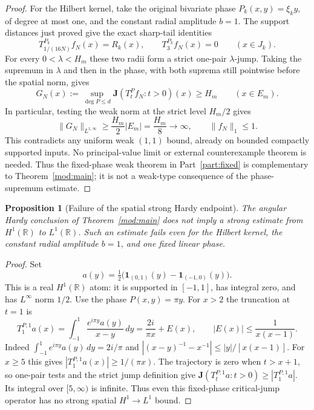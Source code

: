 \documentclass[11pt]{article}
\numberwithin{equation}{section}
\newtheorem{proposition}[theorem]{Proposition}
\theoremstyle{remark}
\theoremstyle{definition}
\begin{document}
\begin{proof}
For the Hilbert kernel, take the original bivariate phase
$P_k(x,y)=\xi_ky$, of degree at most one, and the constant radial amplitude
$b=1$. The support distances just proved give the exact sharp-tail identities
\[
 T^{P_k}_{1/(16N)}f_N(x)=R_k(x),\qquad
 T^{P_k}_{3}f_N(x)=0\qquad(x\in J_k).
\]
For every $0<\lambda<H_m$ these two radii form a strict one-pair
$\lambda$-jump. Taking the supremum in $\lambda$ and then in the phase,
with both suprema still pointwise before the spatial norm, gives
\[
 G_N(x):=\sup_{\deg P\le d}\mathbf J(T^P_t f_N:t>0)(x)
 \ge H_m\qquad(x\in E_m).
\]
In particular, testing the weak norm at the strict level $H_m/2$ gives
\[
 \|G_N\|_{L^{1,\infty}}
 \ge\frac{H_m}{2}|E_m|=\frac{H_m}{8}\longrightarrow\infty,
 \qquad \|f_N\|_1\le1.
\]
This contradicts any uniform weak $(1,1)$ bound, already on bounded
compactly supported inputs. No principal-value limit or external
counterexample theorem is needed. Thus the fixed-phase weak theorem in
Part~\ref{part:fixed} is complementary to Theorem~\ref{mod:main}; it is
not a weak-type consequence of the phase-supremum estimate.
\end{proof}



\begin{proposition}[Failure of the spatial strong Hardy endpoint]
\label{mod:spatial-hardy-obstruction}
The angular Hardy conclusion of Theorem~\ref{mod:main} does not imply
a strong estimate from $H^1(\mathbb R)$ to $L^1(\mathbb R)$.
Such an estimate fails even for the Hilbert kernel, the constant radial
amplitude $b=1$, and one fixed linear phase.
\end{proposition}
\begin{proof}
Set
\[
 a(y)=\tfrac12\bigl(\mathbf1_{(0,1)}(y)-\mathbf1_{(-1,0)}(y)\bigr).
\]
This is a real $H^1(\mathbb R)$ atom: it is supported in $[-1,1]$,
has integral zero, and has $L^\infty$ norm $1/2$. Use the phase
$P(x,y)=\pi y$. For $x>2$ the truncation at $t=1$ is
\[
 T^{P,1}_1a(x)=\int_{-1}^1\frac{e^{i\pi y}a(y)}{x-y}\,dy
             =\frac{2i}{\pi x}+E(x),
 \qquad |E(x)|\le\frac1{x(x-1)}.
\]
Indeed $\int_{-1}^1e^{i\pi y}a(y)\,dy=2i/\pi$ and
$|(x-y)^{-1}-x^{-1}|\le |y|/[x(x-1)]$.
For $x\ge5$ this gives $|T^{P,1}_1a(x)|\ge1/(\pi x)$.
The trajectory is zero when $t>x+1$, so one-pair tests and the strict
jump definition give
$\mathbf J(T^{P,1}_t a:t>0)\ge |T^{P,1}_1a|$.
Its integral over $[5,\infty)$ is infinite. Thus even this fixed-phase
critical-jump operator has no strong spatial $H^1\to L^1$ bound.
\end{proof}
\end{document}
